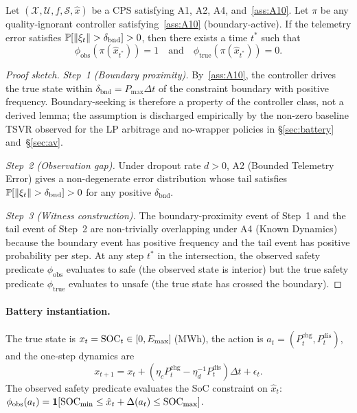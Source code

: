 \begin{theorem}\label{thm:T1}
Let $(\mathcal{X}, \mathcal{U}, f, \mathcal{S}, \hat{x})$ be a CPS satisfying
A1, A2, A4, and~\ref{ass:A10}.  Let $\pi$ be any quality-ignorant controller
satisfying~\ref{ass:A10} (boundary-active).  If the telemetry error satisfies
$\operatorname{\mathbb{P}}[\|\xi_t\| > \delta_{\mathrm{bnd}}] > 0$, then there exists a time $t^*$
such that
\begin{equation}\label{eq:oasg_existence}
  \phi_{\mathrm{obs}}(\pi(\hat{x}_{t^*})) = 1
  \quad\text{and}\quad
  \phi_{\mathrm{true}}(\pi(\hat{x}_{t^*})) = 0.
\end{equation}
\end{theorem}

\begin{proof}[Proof sketch]
\emph{Step~1 (Boundary proximity).}
By~\ref{ass:A10}, the controller drives the true state within
$\delta_{\mathrm{bnd}} = P_{\max}\Delta t$ of the constraint boundary with
positive frequency.  Boundary-seeking is therefore a property of the controller
class, not a derived lemma; the assumption is discharged empirically by the
non-zero baseline TSVR observed for the LP arbitrage and no-wrapper policies in
\S\ref{sec:battery} and~\S\ref{sec:av}.

\emph{Step~2 (Observation gap).}
Under dropout rate $d > 0$, A2 (Bounded Telemetry Error) gives a non-degenerate
error distribution whose tail satisfies
$\operatorname{\mathbb{P}}[\|\xi_t\| > \delta_{\mathrm{bnd}}] > 0$ for any positive
$\delta_{\mathrm{bnd}}$.

\emph{Step~3 (Witness construction).}
The boundary-proximity event of Step~1 and the tail event of Step~2 are
non-trivially overlapping under A4 (Known Dynamics) because the boundary event
has positive frequency and the tail event has positive probability per step.
At any step $t^*$ in the intersection, the observed safety predicate
$\phi_{\mathrm{obs}}$ evaluates to safe (the observed state is interior) but
the true safety predicate $\phi_{\mathrm{true}}$ evaluates to unsafe (the true
state has crossed the boundary).
\end{proof}

\paragraph{Battery instantiation.}
The true state is $x_t = \mathrm{SOC}_t \in [0, E_{\max}]$\,(MWh), the action is
$a_t = (P_t^{\mathrm{chg}}, P_t^{\mathrm{dis}})$, and the one-step dynamics are
\begin{equation}
  x_{t+1} = x_t + (\eta_c P_t^{\mathrm{chg}} - \eta_d^{-1} P_t^{\mathrm{dis}})\Delta t + \epsilon_t.
\end{equation}
The observed safety predicate evaluates the SoC constraint on $\hat{x}_t$:
$\phi_{\mathrm{obs}}(a_t) = \mathbf{1}[\mathrm{SOC}_{\min} \le \hat{x}_t + \Delta(a_t) \le \mathrm{SOC}_{\max}]$.

